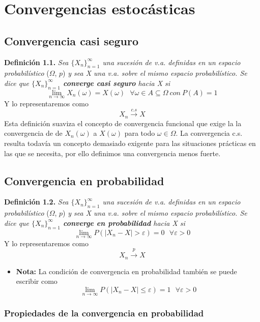 
	
	\section{Convergencias estocásticas}
	\subsection{Convergencia casi seguro}
	\noindent\textbf{Definición 1.1.}\textit{ Sea $\{X_n\}^{\infty}_{n=1}$ una sucesión de v.a. definidas en un espacio probabilístico} ($\Omega$, $p$) \textit{y sea X una v.a. sobre el mismo espacio probabilístico. Se dice que $\{X_n\}^{\infty}_{n=1}$ \textbf{converge casi seguro} hacia X si } $$\lim\limits_{n\rightarrow\infty} X_n(\omega) = X(\omega)\	\ \ \forall \omega \in A \subseteq \Omega \ con\ P(A)=1$$ Y lo representaremos como $$X_n\xrightarrow{c.s} X$$ Esta definición suaviza el concepto de convergencia funcional que exige la la convergencia de de $X_n(\omega)$ a $X(\omega)$ para todo $\omega \in \Omega$. La convergencia c.s. resulta todavía un concepto demasiado exigente para las situaciones prácticas en las que se necesita, por ello definimos una convergencia menos fuerte.
	\\
	
	\subsection{Convergencia en probabilidad}
	\noindent\textbf{Definición 1.2.} \textit{Sea $\{X_n\}^{\infty}_{n=1}$ una sucesión de v.a. definidas en un espacio probabilístico} ($\Omega$, $p$) \textit{y sea X una v.a. sobre el mismo espacio probabilístico. Se dice que $\{X_n\}^{\infty}_{n=1}$ \textbf{converge en probabilidad} hacia X si }
	$$\lim\limits_{n\rightarrow\infty} P(|X_n-X|>\varepsilon)=0\	\ \ \forall \varepsilon >0$$ Y lo representaremos como $$X_n\xrightarrow{p} X$$ 
	\begin{itemize}
		\item \textbf{Nota: }La condición de convergencia en probabilidad también se puede escribir como 	$$\lim\limits_{n\rightarrow\infty} P(|X_n-X|\leq \varepsilon)=1\	\ \ \forall \varepsilon >0$$
	\end{itemize}
	

	
	\subsubsection*{Propiedades de la convergencia en probabilidad}
	
